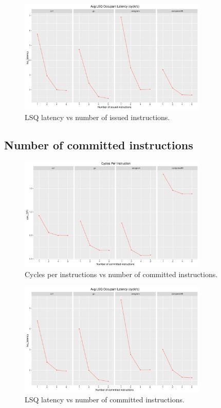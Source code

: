 \documentclass[10pt]{scrartcl}
\begin{document}
\begin{figure}[h]
  \centering
  \includegraphics[width=0.8\textwidth]{Plots/plot_I_lsq_latency}
  \caption{LSQ latency vs number of issued instructions.}\label{fig:i_lsq_latency}
\end{figure}

\FloatBarrier

\subsection{Number of committed instructions}

\begin{figure}[h]
  \centering
  \includegraphics[width=0.8\textwidth]{Plots/plot_C_sim_CPI}
  \caption{Cycles per instructions vs number of committed instructions.}\label{fig:c_sim_cpi}
\end{figure}

\begin{figure}[h]
  \centering
  \includegraphics[width=0.8\textwidth]{Plots/plot_C_lsq_latency}
  \caption{LSQ latency vs number of committed instructions.}\label{fig:c_lsq_latency}
\end{figure}
\end{document}
